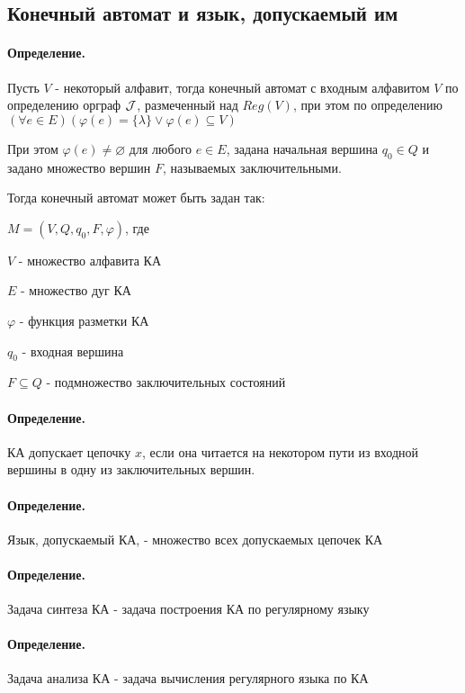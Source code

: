 \documentclass{report}
\begin{document}
\subsection{Конечный автомат и язык, допускаемый им}
\paragraph*{Определение.}
Пусть $V$ - некоторый алфавит, тогда конечный автомат с входным алфавитом  $V$ по
определению орграф  $ {\cal J}$, размеченный над $Reg(V)$, при этом по определению
 $(\forall e \in E)(\varphi(e)=\{\lambda\}  \lor \varphi(e) \subseteq V )$ 

 При этом $\varphi(e) \neq \varnothing$ для любого $e \in E$,
 задана начальная вершина $q_0 \in Q$ и задано множество
 вершин $F$, называемых заключительными.

 Тогда конечный автомат может быть задан так:

  $M = (V,Q,q_0,F, \varphi)$, где

  $V$ - множество алфавита КА

  $E$ - множество дуг КА

   $\varphi$ - функция разметки КА

  $q_0$ - входная вершина
 
  $F \subseteq Q$ - подмножество заключительных состояний

\paragraph*{Определение.}
КА допускает цепочку $x$, если она читается на некотором пути из входной вершины в одну
из заключительных вершин.

 \paragraph*{Определение.}
Язык, допускаемый КА, - множество всех допускаемых цепочек КА

\paragraph*{Определение.}
Задача синтеза КА - задача построения КА по регулярному языку

\paragraph*{Определение.}
Задача анализа КА - задача вычисления регулярного языка по КА
\end{document}
